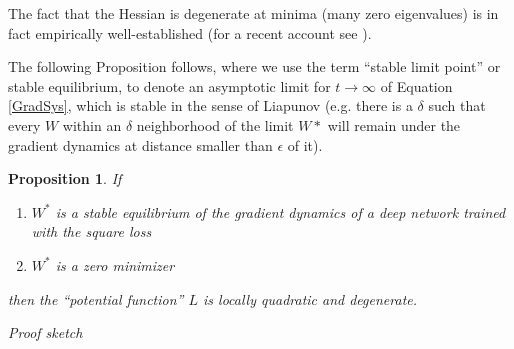 \documentclass[10pt]{article}
\newtheorem{proposition}{Proposition}
\begin{document}
The fact that the Hessian is degenerate at minima (many zero
eigenvalues) is in fact empirically well-established (for a recent
account see \cite{DBLP:journals/corr/SagunBL16}).


The following Proposition follows, where we use the term ``stable
limit point'' or stable equilibrium, to denote an asymptotic limit for $t \to \infty$ of
Equation \ref{GradSys}, which is stable in the sense of Liapunov (e.g.
there is a $\delta$ such that every $W$ within an $\delta$
neighborhood of the limit $W*$ will remain under the gradient dynamics
at distance smaller than $\epsilon$ of it).




\begin{proposition}
\label{proposition}
If 
\begin{enumerate}
 \item $W^*$ is a stable equilibrium of the gradient dynamics of a
   deep network trained with the square loss
\item $W^*$ is a  zero minimizer 
\end{enumerate}
then the ``potential function'' $L$ is locally quadratic and
degenerate.
\end{proposition}


{\it Proof sketch}
\end{document}
